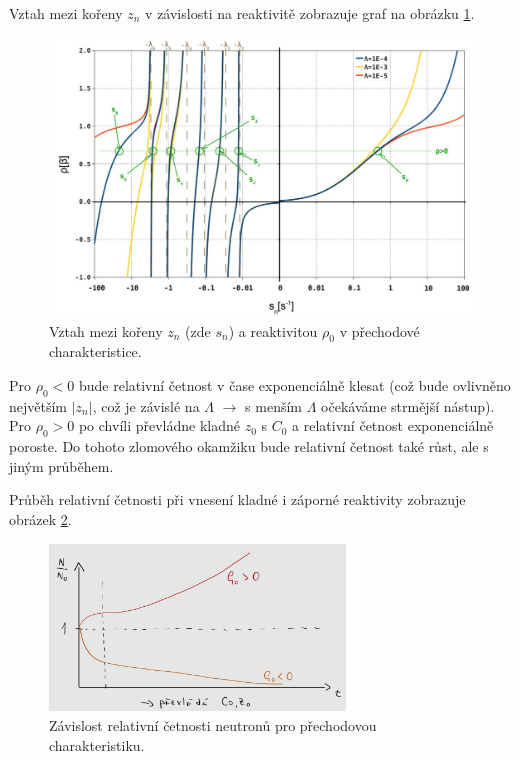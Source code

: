 Vztah mezi kořeny $z_n$ v závislosti na reaktivitě zobrazuje graf na obrázku \ref{fig_zn-rho}.

\begin{figure}[H]
  \centering
  \includegraphics[width=1\textwidth]{img/zn-rho.jpg}
  \caption{Vztah mezi kořeny $z_n$ (zde $s_n$) a reaktivitou $\rho_0$ v přechodové charakteristice.}
  \label{fig_zn-rho}
\end{figure}

Pro $\rho_0 < 0$ bude relativní četnost v čase exponenciálně klesat (což bude ovlivněno největším $|z_n|$, což je závislé na $\Lambda$ $\rightarrow$ s menším $\Lambda$ očekáváme strmější nástup).\\

Pro $\rho_0 > 0$ po chvíli převládne kladné $z_0$ s $C_0$ a relativní četnost exponenciálně poroste. Do tohoto zlomového okamžiku bude relativní četnost také růst, ale s jiným průběhem.

Průběh relativní četnosti při vnesení kladné i záporné reaktivity zobrazuje obrázek \ref{fig_prechodova}.

\begin{figure}[H]
  \centering
  \includegraphics[width=0.7\textwidth]{img/prechodova.jpg}
  \caption{Závislost relativní četnosti neutronů pro přechodovou charakteristiku.}
  \label{fig_prechodova}
\end{figure}




